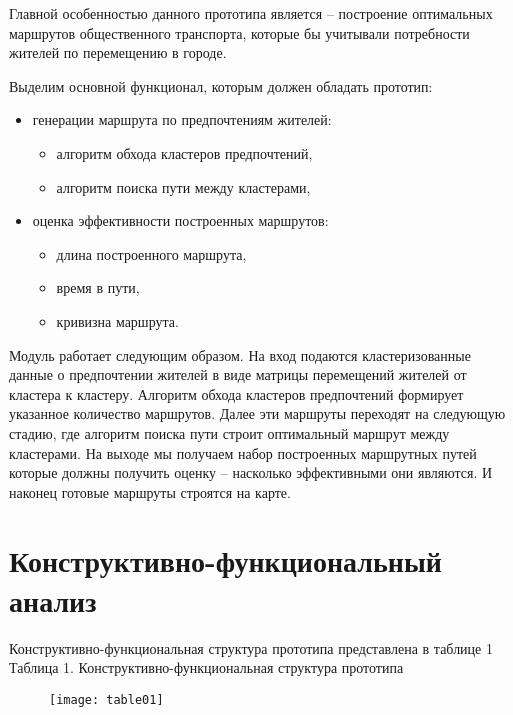 Главной особенностью данного прототипа является -- построение оптимальных маршрутов общественного 
транспорта, которые бы учитывали потребности жителей по перемещению в городе. 

Выделим основной функционал, которым должен обладать прототип:
\begin{itemize}
    \item генерации маршрута по предпочтениям жителей:
    \begin{itemize}
        \item алгоритм обхода кластеров предпочтений,
        \item алгоритм поиска пути между кластерами,
    \end{itemize}
    \item оценка эффективности построенных маршрутов:
    \begin{itemize}
        \item длина построенного маршрута,
        \item время в пути,
        \item кривизна маршрута.
    \end{itemize}
\end{itemize}

Модуль работает следующим образом. На вход подаются кластеризованные данные о предпочтении жителей в виде 
матрицы перемещений жителей от кластера к кластеру. Алгоритм обхода кластеров предпочтений формирует 
указанное количество маршрутов. Далее эти маршруты переходят на следующую стадию, где алгоритм поиска 
пути строит оптимальный маршрут между кластерами. На выходе мы получаем набор построенных маршрутных 
путей которые должны получить оценку -- насколько эффективными они являются. И наконец готовые маршруты 
строятся на карте.

\chapter{Конструктивно-функциональный анализ}
Конструктивно-функциональная структура прототипа представлена в таблице 1\\

Таблица 1. Конструктивно-функциональная структура прототипа
\begin{figure}[h!]
    \center
    \texttt{[image: table01]}
\end{figure}

\pagebreak

